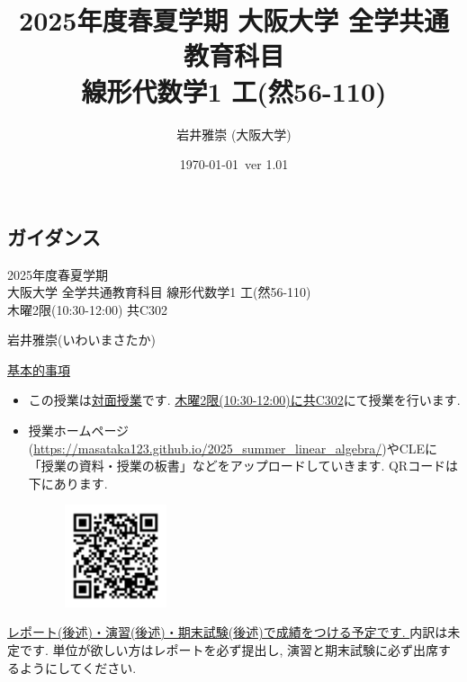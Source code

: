 \documentclass[dvipdfmx,a4paper,11pt]{article}
\title{2025年度春夏学期  大阪大学 全学共通教育科目 \\ 線形代数学1 工(然56-110)}
\author{岩井雅崇 (大阪大学)}
\date{\today \, ver 1.01}
\theoremstyle{definition}
\begin{document}
\maketitle
\setcounter{tocdepth}{2}
\tableofcontents
\newpage

\begin{center}
\setcounter{section}{-1}
\section{ガイダンス}
\label{sec-guide}
\end{center}

\begin{center}
{\Large 2025年度春夏学期 \\ 大阪大学 全学共通教育科目 線形代数学1 工(然56-110)} \\
木曜2限(10:30-12:00) 共C302
\end{center}
\begin{flushright}
 岩井雅崇(いわいまさたか) \\
\end{flushright}
{\Large \underline{基本的事項}}
\begin{itemize}
  \setlength{\parskip}{0cm} %
  \setlength{\itemsep}{0cm} %
\item この授業は\underline{対面授業}です. \underline{木曜2限(10:30-12:00)に共C302}にて授業を行います.
\item 授業ホームページ(\url{https://masataka123.github.io/2025_summer_linear_algebra/})やCLEに「授業の資料・授業の板書」などをアップロードしていきます. 
QRコードは下にあります.
\begin{figure}[htbp]
\begin{center}
 \includegraphics[height=30mm, width=30mm]{linalg.png}
\end{center}
\end{figure}
\end{itemize}

\vspace{-18pt}

\underline{レポート(後述)・演習(後述)・期末試験(後述)で成績をつける予定です. } 内訳は未定です. 
単位が欲しい方はレポートを必ず提出し, 演習と期末試験に必ず出席するようにしてください. 
\end{document}
